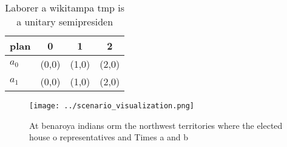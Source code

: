 \documentclass[a4paper]{article}
\begin{document}
\begin{table}
\begin{adjustbox}{width=0.6\columnwidth}
\begin{tabular}{|l|l|l|l|}
\hline
\textbf{plan} & \multicolumn{1}{c|}{\textbf{0}} & \multicolumn{1}{c|}{\textbf{1}} & \multicolumn{1}{c|}{\textbf{2}} \\ \hline
\textbf{$a_0$}  & (0,0) & (1,0) & (2,0) \\ \hline
\textbf{$a_1$}  & (0,0) & (1,0) & (2,0) \\ \hline
\end{tabular}
\end{adjustbox}
\caption{Laborer a wikitampa tmp is a unitary semipresiden
}
\end{table}

\begin{figure}
\centering
\texttt{[image: ../scenario\_visualization.png]}
\caption{At benaroya indians orm the northwest territories where the elected house o representatives and Times a and b
}
\end{figure}
 
\end{document}
